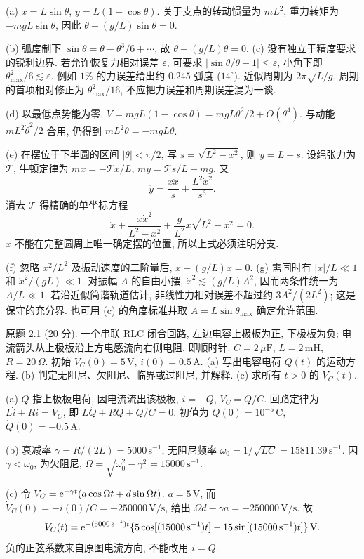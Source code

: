 \begin{solution}
(a) $x=L\sin\theta$, $y=L(1-\cos\theta)$. 关于支点的转动惯量为 $mL^2$, 重力转矩为 $-mgL\sin\theta$, 因此 $\ddot\theta+(g/L)\sin\theta=0$.

(b) 弧度制下 $\sin\theta=\theta-\theta^3/6+\cdots$, 故 $\ddot\theta+(g/L)\theta=0$. (c) 没有独立于精度要求的锐利边界. 若允许恢复力相对误差 $\varepsilon$, 可要求 $|\sin\theta/\theta-1|\le\varepsilon$, 小角下即 $\theta_{\max}^2/6\lesssim\varepsilon$. 例如 $1\%$ 的力误差给出约 $0.245$ 弧度 ($14^\circ$). 近似周期为 $2\pi\sqrt{L/g}$. 周期的首项相对修正为 $\theta_{\max}^2/16$, 不应把力误差和周期误差混为一谈.

(d) 以最低点势能为零, $V=mgL(1-\cos\theta)=mgL\theta^2/2+O(\theta^4)$. 与动能 $mL^2\dot\theta^2/2$ 合用, 仍得到 $mL^2\ddot\theta=-mgL\theta$.

(e) 在摆位于下半圆的区间 $|\theta|<\pi/2$, 写 $s=\sqrt{L^2-x^2}$, 则 $y=L-s$. 设绳张力为 $\mathcal T$, 牛顿定律为 $m\ddot x=-\mathcal T x/L$, $m\ddot y=\mathcal T s/L-mg$. 又
\[
\ddot y=\frac{x\ddot x}{s}+\frac{L^2\dot x^2}{s^3}.
\]
消去 $\mathcal T$ 得精确的单坐标方程
\[
\ddot x+\frac{x\dot x^2}{L^2-x^2}+\frac g{L^2}x\sqrt{L^2-x^2}=0.
\]
$x$ 不能在完整圆周上唯一确定摆的位置, 所以上式必须注明分支.

(f) 忽略 $x^2/L^2$ 及振动速度的二阶量后, $\ddot x+(g/L)x=0$. (g) 需同时有 $|x|/L\ll1$ 和 $\dot x^2/(gL)\ll1$. 对振幅 $A$ 的自由小摆, $\dot x^2\lesssim(g/L)A^2$, 因而两条件统一为 $A/L\ll1$. 若沿近似简谐轨道估计, 非线性力相对误差不超过约 $3A^2/(2L^2)$; 这是保守的充分界. 也可用 (c) 的角度标准并取 $A=L\sin\theta_{\max}$ 确定允许范围.
\end{solution}
\begin{exercise}\label{ps:2.1}
原题 2.1 (20 分). 一个串联 RLC 闭合回路, 左边电容上极板为正, 下极板为负; 电流箭头从上极板沿上方电感流向右侧电阻, 即顺时针. $C=2\,\mu\mathrm F$, $L=2\,\mathrm{mH}$, $R=20\,\Omega$. 初始 $V_C(0)=5\,\mathrm V$, $i(0)=0.5\,\mathrm A$. (a) 写出电容电荷 $Q(t)$ 的运动方程. (b) 判定无阻尼、欠阻尼、临界或过阻尼, 并解释. (c) 求所有 $t>0$ 的 $V_C(t)$.
\end{exercise}
\begin{solution}
(a) $Q$ 指上极板电荷, 因电流流出该极板, $i=-\dot Q$, $V_C=Q/C$. 回路定律为 $L\dot i+Ri=V_C$, 即 $L\ddot Q+R\dot Q+Q/C=0$. 初值为 $Q(0)=10^{-5}\,\mathrm C$, $\dot Q(0)=-0.5\,\mathrm A$.

(b) 衰减率 $\gamma=R/(2L)=5000\,\mathrm{s}^{-1}$, 无阻尼频率 $\omega_0=1/\sqrt{LC}=15811.39\,\mathrm{s}^{-1}$. 因 $\gamma<\omega_0$, 为欠阻尼, $\Omega=\sqrt{\omega_0^2-\gamma^2}=15000\,\mathrm{s}^{-1}$.

(c) 令 $V_C=\mathrm e^{-\gamma t}(a\cos\Omega t+d\sin\Omega t)$. $a=5\,\mathrm V$, 而 $\dot V_C(0)=-i(0)/C=-250000\,\mathrm{V/s}$, 给出 $\Omega d-\gamma a=-250000\,\mathrm{V/s}$. 故
\[
V_C(t)=\mathrm e^{-(5000\,\mathrm{s}^{-1})t}\{5\cos[(15000\,\mathrm{s}^{-1})t]-15\sin[(15000\,\mathrm{s}^{-1})t]\}\,\mathrm V.
\]
负的正弦系数来自原图电流方向, 不能改用 $i=\dot Q$.
\end{solution}
